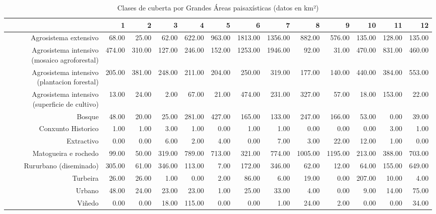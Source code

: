\begin{table}[p]
\centering
\caption{Clases de cuberta por Grandes Áreas paisaxísticas (datos en km²)} 
\label{xtaboa2}
\begin{tabular}{rrrrrrrrrrrrr}
  \hline
 & 1 & 2 & 3 & 4 & 5 & 6 & 7 & 8 & 9 & 10 & 11 & 12 \\ 
  \hline
Agrosistema extensivo & 68.00 & 25.00 & 62.00 & 622.00 & 963.00 & 1813.00 & 1356.00 & 882.00 & 576.00 & 135.00 & 128.00 & 135.00 \\ 
  Agrosistema intensivo (mosaico agroforestal) & 474.00 & 310.00 & 127.00 & 246.00 & 152.00 & 1253.00 & 1946.00 & 92.00 & 31.00 & 470.00 & 831.00 & 460.00 \\ 
  Agrosistema intensivo (plantacion forestal) & 205.00 & 381.00 & 248.00 & 211.00 & 204.00 & 250.00 & 319.00 & 177.00 & 140.00 & 440.00 & 384.00 & 553.00 \\ 
  Agrosistema intensivo (superficie de cultivo) & 13.00 & 24.00 & 2.00 & 67.00 & 21.00 & 474.00 & 231.00 & 327.00 & 57.00 & 18.00 & 153.00 & 22.00 \\ 
  Bosque & 48.00 & 20.00 & 25.00 & 281.00 & 427.00 & 165.00 & 133.00 & 247.00 & 166.00 & 53.00 & 0.00 & 39.00 \\ 
  Conxunto Historico & 1.00 & 1.00 & 3.00 & 1.00 & 0.00 & 1.00 & 1.00 & 0.00 & 0.00 & 0.00 & 3.00 & 1.00 \\ 
  Extractivo & 0.00 & 0.00 & 6.00 & 2.00 & 4.00 & 0.00 & 7.00 & 3.00 & 22.00 & 12.00 & 1.00 & 0.00 \\ 
  Matogueira e rochedo & 99.00 & 50.00 & 319.00 & 789.00 & 713.00 & 321.00 & 774.00 & 1005.00 & 1195.00 & 213.00 & 388.00 & 703.00 \\ 
  Rururbano (diseminado) & 305.00 & 61.00 & 346.00 & 113.00 & 7.00 & 172.00 & 346.00 & 62.00 & 12.00 & 64.00 & 155.00 & 649.00 \\ 
  Turbeira & 26.00 & 26.00 & 1.00 & 0.00 & 2.00 & 86.00 & 6.00 & 19.00 & 0.00 & 207.00 & 10.00 & 4.00 \\ 
  Urbano & 48.00 & 24.00 & 23.00 & 23.00 & 1.00 & 25.00 & 33.00 & 4.00 & 0.00 & 9.00 & 14.00 & 75.00 \\ 
  Viñedo & 0.00 & 0.00 & 18.00 & 115.00 & 0.00 & 0.00 & 1.00 & 24.00 & 2.00 & 0.00 & 0.00 & 34.00 \\ 
   \hline
\end{tabular}
\end{table}
